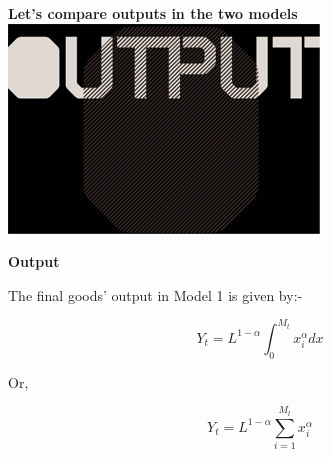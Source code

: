 \documentclass[a4paper, 12pt]{article}
\begin{document}
	\newpage
	\begin{center}
		\textbf{Let's compare outputs in the two models}
		\includegraphics{images/output}	
	\end{center}			

	\newpage
	\begin{flushleft}
		\textbf{Output}
	\end{flushleft}	
	\begin{flushleft}
		The final goods' output in Model 1 is given by:-
	\end{flushleft}
	\begin{center}
		$$ Y_t = L^{1-\alpha}\int_{0}^{M_t}x_i^{\alpha}dx$$
		\begin{flushleft}
			Or,
		\end{flushleft}
		\begin{center}
			$$Y_t = L^{1-\alpha} \sum_{i=1}^{M_t} x_i^{\alpha} $$
		\end{center}
	\end{center}
\end{document}
